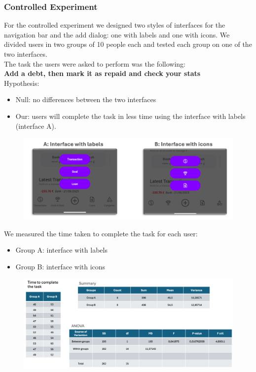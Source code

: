 \documentclass[a4paper,12pt]{article}
\begin{document}
\subsubsection{Controlled Experiment}
For the controlled experiment we designed two styles of interfaces for the navigation bar and the add dialog: one with labels and one with icons. 
We divided users in two groups of 10 people each and tested each group on one of the two interfaces.\\The task the users were asked to perform was the following:
\vspace{0.5cm}\\
\textbf{Add a debt, then mark it as repaid and check your stats}
\vspace{0.5cm}\\
Hypothesis:
\begin{itemize}
    \item Null: no differences between the two interfaces
    \item Our: users will complete the task in less time using the interface with
    labels (interface A).
\end{itemize}
\begin{figure}[H]
    \centering
    \includegraphics[width=\linewidth]{interf.png}
\end{figure}
We measured the time taken to complete the task for each user:
\begin{itemize}
    \item Group A: interface with labels
    \item Group B: interface with icons
\end{itemize}
\begin{figure}[H]
    \centering
    \includegraphics[width=\linewidth]{ANOVA.png}
\end{figure}
\end{document}
